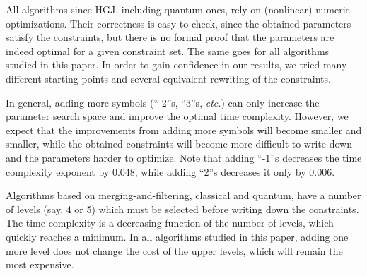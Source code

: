 \begin{remark}
All algorithms since HGJ, including quantum ones, rely on (nonlinear) numeric optimizations. Their correctness is easy to check, since the obtained parameters satisfy the constraints, but there is no formal proof that the parameters are indeed optimal for a given constraint set. The same goes for all algorithms studied in this paper. In order to gain confidence in our results, we tried many different starting points and several equivalent rewriting of the constraints.
\end{remark}


\begin{remark}
In general, adding more symbols (``-2''s, ``3''s, \emph{etc.}) can only increase the parameter search space and improve the optimal time complexity. However, we expect that the improvements from adding more symbols will become smaller and smaller, while the obtained constraints will become more difficult to write down and the parameters harder to optimize. Note that adding ``-1''s decreases the time complexity exponent by $0.048$, while adding ``2''s decreases it only by $0.006$.
\end{remark}

\begin{remark}
Algorithms based on merging-and-filtering, classical and quantum, have a number of levels (say, 4 or 5) which must be selected before writing down the constraints. The time complexity is a decreasing function of the number of levels, which quickly reaches a minimum. In all algorithms studied in this paper, adding one more level does not change the cost of the upper levels, which will remain the most expensive. 
\end{remark}

